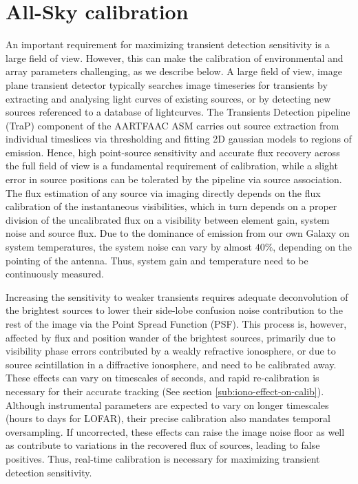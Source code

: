 \documentclass{aa}
\begin{document}
\section{\label{sec:Array-calibration-for}All-Sky calibration}
An important requirement for maximizing transient detection sensitivity
is a large field of view. However, this can make the calibration of
environmental and array parameters challenging, as we describe below.
A large field of view, image plane transient detector typically searches
image timeseries for transients by extracting and analysing light
curves of existing sources, or by detecting new sources referenced
to a database of lightcurves. The Transients Detection pipeline (TraP)
\citep{swinbank2013trap} component of the AARTFAAC ASM carries out
source extraction from individual timeslices via thresholding and
fitting 2D gaussian models to regions of emission. Hence, high point-source
sensitivity and accurate flux recovery across the full field of view
is a fundamental requirement of calibration, while a slight error
in source positions can be tolerated by the pipeline via source association.
The flux estimation of any source via imaging directly depends on
the flux calibration of the instantaneous visibilities, which in turn
depends on a proper division of the uncalibrated flux on a visibility
between element gain, system noise and source flux. Due to the dominance
of emission from our own Galaxy on system temperatures, the system
noise can vary by almost $40\%$, depending on the pointing of the
antenna. Thus, system gain and temperature need to be continuously
measured. 

Increasing the sensitivity to weaker transients requires adequate
deconvolution of the brightest sources to lower their side-lobe confusion
noise contribution to the rest of the image via the Point Spread Function
(PSF). This process is, however, affected by flux and position wander
of the brightest sources, primarily due to visibility phase errors
contributed by a weakly refractive ionosphere, or due to source scintillation
in a diffractive ionosphere, and need to be calibrated away. These
effects can vary on timescales of seconds, and rapid re-calibration
is necessary for their accurate tracking (See section \ref{sub:iono-effect-on-calib}).
Although instrumental parameters are expected to vary on longer timescales
(hours to days for LOFAR), their precise calibration also mandates
temporal oversampling. If uncorrected, these effects can raise the
image noise floor as well as contribute to variations in the recovered
flux of sources, leading to false positives. Thus, real-time calibration
is necessary for maximizing transient detection sensitivity. 
\end{document}
